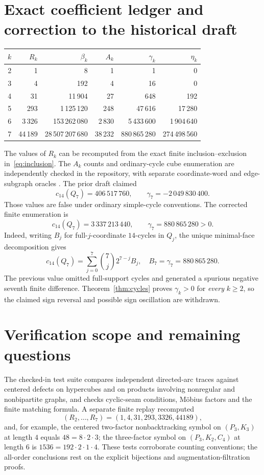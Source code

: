 \documentclass[11pt]{amsart}
\theoremstyle{definition}
\theoremstyle{remark}
\begin{document}
\section{Exact coefficient ledger and correction to the historical draft}
\begin{center}
\begin{tabular}{@{}r r r r r r@{}}\toprule
$k$ & $R_k$ & $\beta_k$ & $A_k$ & $\gamma_k$ & $\eta_k$\\\midrule
2&1&8&1&1&0\\
3&4&192&4&16&0\\
4&31&11\,904&27&648&192\\
5&293&1\,125\,120&248&47\,616&17\,280\\
6&3\,326&153\,262\,080&2\,830&5\,433\,600&1\,904\,640\\
7&44\,189&28\,507\,207\,680&38\,232&880\,865\,280&274\,498\,560\\
\bottomrule\end{tabular}
\end{center}
The values of $R_k$ can be recomputed from the exact finite
inclusion--exclusion in~\eqref{eq:inclusion}. The $A_k$ counts and
ordinary-cycle cube enumeration are independently checked in the
repository, with separate coordinate-word and edge-subgraph oracles
\cite{GPR}. The prior draft claimed
\[
 c_{14}(Q_7)=406\,517\,760,\qquad \gamma_7=-2\,049\,830\,400.
\]
Those values are false under ordinary simple-cycle conventions. The
corrected finite enumeration is
\begin{equation}\label{eq:correct7}
\boxed{c_{14}(Q_7)=3\,337\,213\,440,\qquad
\gamma_7=880\,865\,280>0.}
\end{equation}
Indeed, writing $B_j$ for full-$j$-coordinate $14$-cycles in $Q_j$,
the unique minimal-face decomposition gives
\[
 c_{14}(Q_7)=\sum_{j=0}^7\binom7j2^{7-j} B_j,
\quad B_7=\gamma_7=880\,865\,280.
\]
The previous value omitted full-support cycles and generated a
spurious negative seventh finite difference. Theorem~\ref{thm:cycles}
proves $\gamma_k>0$ for \emph{every} $k\ge2$, so the claimed
sign reversal and possible sign oscillation are withdrawn.

\section{Verification scope and remaining questions}
The checked-in test suite compares independent directed-arc traces
against centered defects on hypercubes and on products involving
nonregular and nonbipartite graphs, and checks cyclic-seam conditions,
M\"obius factors and the finite matching formula. A separate finite
replay recomputed
\[
 (R_2,\ldots,R_7)=(1,4,31,293,3326,44189),
\]
and, for example, the centered two-factor nonbacktracking symbol on
$(P_3,K_3)$ at length $4$ equals $48=8\cdot2\cdot3$; the
three-factor symbol on $(P_3,K_2,C_4)$ at length $6$ is
$1536=192\cdot2\cdot1\cdot4$.
These tests corroborate counting conventions; the all-order conclusions
rest on the explicit bijections and augmentation-filtration proofs.
\end{document}
